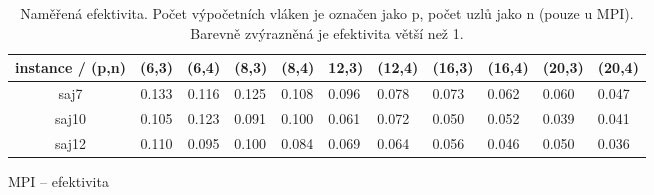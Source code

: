 \documentclass{article}
\begin{document}
\begin{table}[ht!]
        \begin{subtable}{.5\linewidth}\centering
        \centering
        \begin{tabular}{|c|c|c|l|l|l|l|l|l|l|l|}
            \hline
            \textbf{instance / (p,n)} &
            \textbf{(6,3)} &
            \textbf{(6,4)} &
            \multicolumn{1}{c|}{\textbf{(8,3)}} &
            \multicolumn{1}{c|}{\textbf{(8,4)}} &
            \textbf{12,3)} &
            \textbf{(12,4)} &
            \textbf{(16,3)} &
            \textbf{(16,4)} &
            \textbf{(20,3)} &
            \textbf{(20,4)} \\ \hline
            saj7  & 0.133 & 0.116 & 0.125 & 0.108 & 0.096 & 0.078 & 0.073 & 0.062 & 0.060 & 0.047 \\ \hline
            saj10 & 0.105 & 0.123 & 0.091 & 0.100 & 0.061 & 0.072 & 0.050 & 0.052 & 0.039 & 0.041 \\ \hline
            saj12 & 0.110 & 0.095 & 0.100 & 0.084 & 0.069 & 0.064 & 0.056 & 0.046 & 0.050 & 0.036 \\ \hline
        \end{tabular}
        \caption{MPI -- efektivita}
        \label{tab:efektivita-mpi}
        \end{subtable}

        \caption{Naměřená efektivita. Počet výpočetních vláken je označen jako p, počet uzlů jako n (pouze u MPI). Barevně zvýrazněná je efektivita větší než 1.}
        \label{tab:efektivita}
    \end{table}
\end{document}
